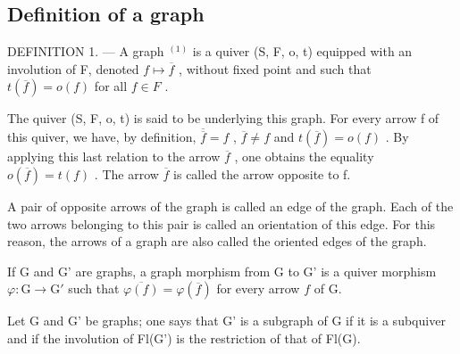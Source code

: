 \subsection{Definition of a graph}

DEFINITION 1. --- A graph \(^{(1)}\) is a quiver (S, F, o, t) equipped with an involution of F, denoted \(f \mapsto \overline{f}\) , without fixed point and such that \(t(\overline{f}) = o(f)\) for all \(f \in F\) .

The quiver (S, F, o, t) is said to be underlying this graph. For every arrow f of this quiver, we have, by definition, \(\overline{\overline{f}} = f\) , \(\overline{f} \neq f\) and \(t(\overline{f}) = o(f)\) . By applying this last relation to the arrow \(\overline{f}\) , one obtains the equality \(o(\overline{f}) = t(f)\) . The arrow \(\overline{f}\) is called the arrow opposite to f.

A pair of opposite arrows of the graph is called an edge of the graph. Each of the two arrows belonging to this pair is called an orientation of this edge. For this reason, the arrows of a graph are also called the oriented edges of the graph.

If G and G' are graphs, a graph morphism from G to G' is a quiver morphism \(\varphi\colon\mathrm{G}\to\mathrm{G}'\) such that \(\overline{\varphi(f)}=\varphi(\overline{f})\) for every arrow \(f\) of G.

Let G and G' be graphs; one says that G' is a subgraph of G if it is a subquiver and if the involution of Fl(G') is the restriction of that of Fl(G).

